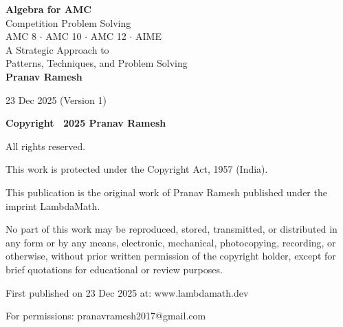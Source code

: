\documentclass[12pt]{extarticle}
\begin{document}
\begin{titlepage}
\centering
\vspace*{2cm}

{\Huge\bfseries Algebra for AMC}\\[0.5cm]
{\Large Competition Problem Solving}\\[2cm]

{\large AMC 8 $\cdot$ AMC 10 $\cdot$ AMC 12 $\cdot$ AIME}\\[3cm]

{\Large A Strategic Approach to\\[0.3cm]
Patterns, Techniques, and Problem Solving}\\[3cm]

{\Large\textbf{Pranav Ramesh}}\\[3cm]

\vfill

{\large 23 Dec 2025 (Version 1)}
\end{titlepage}

\thispagestyle{empty}
\vspace*{\fill}
\begin{center}
\textbf{\Large Copyright \textcopyright\ 2025 Pranav Ramesh}

All rights reserved.

This work is protected under the Copyright Act, 1957 (India).

\vspace{1.5cm}

This publication is the original work of Pranav Ramesh published under the imprint LambdaMath.

\vspace{1.5cm}

No part of this work may be reproduced, stored, transmitted, or distributed in any form or by any means, electronic, mechanical, photocopying, recording, or otherwise, without prior written permission of the copyright holder, except for brief quotations for educational or review purposes.

\vspace{1.5cm}

First published on 23 Dec 2025 at: www{.}lambdamath{.}dev

For permissions: pranavramesh2017@gmail{.}com
\end{center}
\vspace*{\fill}

\newpage
\end{document}
